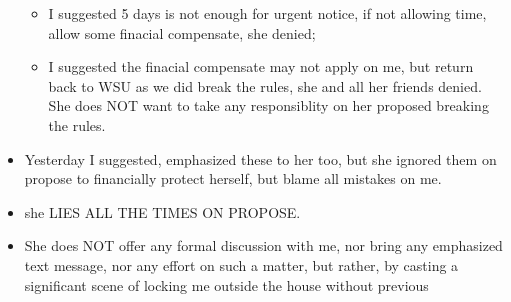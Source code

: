 \documentclass[9pt, b5paper]{article}
\begin{document}
\begin{itemize}
\begin{itemize}
\item I suggested 5 days is not enough for urgent notice, if not allowing time, allow some finacial compensate, she denied;
\item I suggested the finacial compensate may not apply on me, but return back to WSU as we did break the rules, she and all her friends denied. She does NOT want to take any responsiblity on her proposed breaking the rules.
\end{itemize}
\item Yesterday I suggested, emphasized these to her too, but she ignored them on propose to financially protect herself, but blame all mistakes on me.
\item she LIES ALL THE TIMES ON PROPOSE.
\item She does NOT offer any formal discussion with me, nor bring any emphasized text message, nor any effort on such a matter, but rather, by casting a significant scene of locking me outside the house without previous
\end{itemize}
\end{document}

